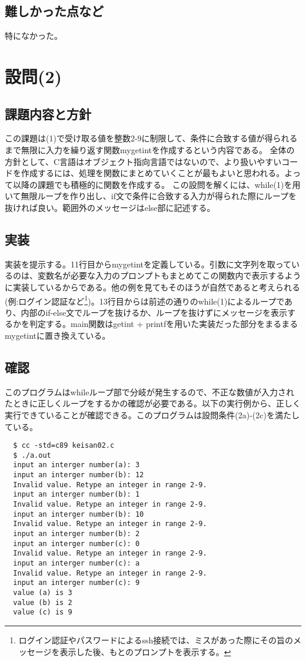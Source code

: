 \documentclass[dvipdfmx,12pt,a4j]{jarticle}
\begin{document}
\subsection{難しかった点など}
特になかった。

\section{設問(2)}
\subsection{課題内容と方針}
この課題は(1)で受け取る値を整数2-9に制限して、条件に合致する値が得られるまで無限に入力を繰り返す関数mygetintを作成するという内容である。
全体の方針として、C言語はオブジェクト指向言語ではないので、より扱いやすいコードを作成するには、処理を関数にまとめていくことが最もよいと思われる。よって以降の課題でも積極的に関数を作成する。
この設問を解くには、while(1)を用いて無限ループを作り出し、if文で条件に合致する入力が得られた際にループを抜ければ良い。範囲外のメッセージはelse部に記述する。

\subsection{実装}
実装を提示する。11行目からmygetintを定義している。引数に文字列を取っているのは、変数名が必要な入力のプロンプトもまとめてこの関数内で表示するように実装しているからである。他の例を見てもそのほうが自然であると考えられる(例:ログイン認証など\footnote{ログイン認証やパスワードによるssh接続では、ミスがあった際にその旨のメッセージを表示した後、もとのプロンプトを表示する。})。13行目からは前述の通りのwhile(1)によるループであり、内部のif-else文でループを抜けるか、ループを抜けずにメッセージを表示するかを判定する。main関数はgetint + printfを用いた実装だった部分をまるまるmygetintに置き換えている。


\subsection{確認}
このプログラムはwhileループ部で分岐が発生するので、不正な数値が入力されたときに正しくループをするかの確認が必要である。以下の実行例から、正しく実行できていることが確認できる。このプログラムは設問条件(2a)-(2c)を満たしている。
\begin{verbatim}
  $ cc -std=c89 keisan02.c
  $ ./a.out
  input an interger number(a): 3
  input an interger number(b): 12
  Invalid value. Retype an integer in range 2-9.
  input an interger number(b): 1
  Invalid value. Retype an integer in range 2-9.
  input an interger number(b): 10
  Invalid value. Retype an integer in range 2-9.
  input an interger number(b): 2
  input an interger number(c): 0
  Invalid value. Retype an integer in range 2-9.
  input an interger number(c): a
  Invalid value. Retype an integer in range 2-9.
  input an interger number(c): 9
  value (a) is 3
  value (b) is 2
  value (c) is 9
\end{verbatim}
\end{document}
